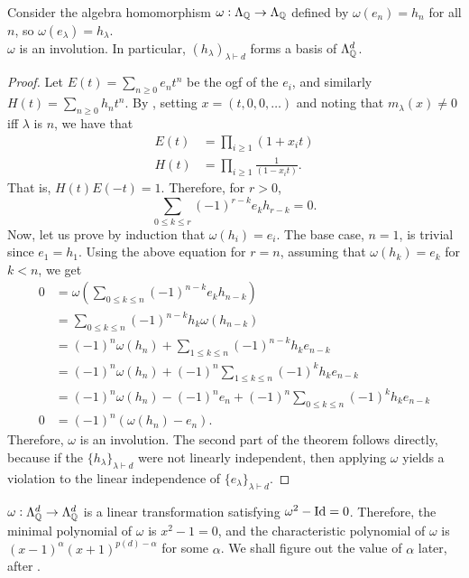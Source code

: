 	\begin{ftheo}
		\label{theo: h basis}
		Consider the algebra homomorphism $\omega : \Lambda_{\mathbb{Q}} \to \Lambda_{\mathbb{Q}}$ defined by $\omega(e_n) = h_n$ for all $n$, so $\omega(e_\lambda) = h_\lambda$.\\
		$\omega$ is an involution. In particular, $(h_\lambda)_{\lambda \vdash d}$ forms a basis of $\Lambda_{\mathbb{Q}}^d$.
	\end{ftheo}
	\begin{proof}
		Let $E(t) = \sum_{n \ge 0} e_n t^n$ be the ogf of the $e_i$, and similarly $H(t) = \sum_{n \ge 0} h_n t^n$. By , setting $x = (t,0,0,\ldots)$ and noting that $m_\lambda(x) \ne 0$ iff $\lambda$ is $n$, we have that
		\begin{align*}
			E(t) &= \prod_{i \ge 1} (1+x_it) \\
			H(t) &= \prod_{i \ge 1} \frac{1}{(1-x_it)}.
		\end{align*}
		That is, $H(t) E(-t) = 1$. Therefore, for $r > 0$,
		\[ \sum_{0 \le k \le r} (-1)^{r-k} e_k h_{r-k} = 0. \]
		Now, let us prove by induction that $\omega(h_i) = e_i$. The base case, $n = 1$, is trivial since $e_1 = h_1$. Using the above equation for $r = n$, assuming that $\omega(h_k) = e_k$ for $k < n$, we get
		\begin{align*}
			0 &= \omega\left(\sum_{0 \le k \le n} (-1)^{n-k} e_k h_{n-k}\right) \\
				&= \sum_{0 \le k \le n} (-1)^{n-k} h_k \omega(h_{n-k}) \\
				&= (-1)^{n}\omega(h_n) + \sum_{1 \le k \le n} (-1)^{n-k} h_k e_{n-k} \\
				&= (-1)^{n}\omega(h_n) + (-1)^n \sum_{1 \le k \le n} (-1)^{k} h_k e_{n-k} \\
				&= (-1)^n \omega(h_n) - (-1)^n e_n + (-1)^n \sum_{0 \le k \le n} (-1)^k h_k e_{n-k} \\
			0 &= (-1)^n (\omega(h_n) - e_n).
		\end{align*}
		Therefore, $\omega$ is an involution. The second part of the theorem follows directly, because if the $\{h_\lambda\}_{\lambda \vdash d}$ were not linearly independent, then applying $\omega$ yields a violation to the linear independence of $\{e_\lambda\}_{\lambda \vdash d}$.
	\end{proof}

	\begin{remark}
		$\omega : \Lambda_{\mathbb{Q}}^d \to \Lambda_{\mathbb{Q}}^d$ is a linear transformation satisfying $\omega^2 - \operatorname{Id} = 0$. Therefore, the minimal polynomial of $\omega$ is $x^2 - 1 = 0$, and the characteristic polynomial of $\omega$ is $(x-1)^\alpha (x+1)^{p(d) - \alpha}$ for some $\alpha$. We shall figure out the value of $\alpha$ later, after .
	\end{remark}

